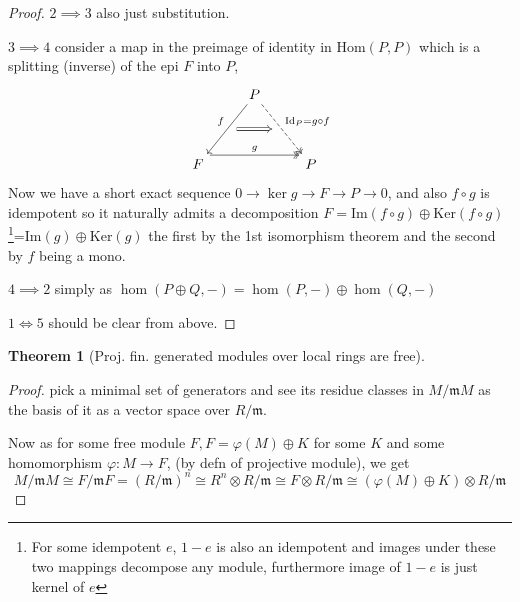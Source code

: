\documentclass[12pt]{article}
\numberwithin{equation}{section}
\newcommand{\Hom}{{\mathrm{Hom}}}
\newcommand{\image}{{\mathrm{Im}}}
\newcommand{\kernel}{{\mathrm{Ker}}}
\newtheorem{theorem}{Theorem}[section]
\begin{document}
\begin{appendices}
\begin{proof}
		$2 \implies 3$ also just substitution.
		
		$3 \implies 4$ consider a map in the preimage of identity in $\Hom(P,P)$ which is a splitting (inverse) of the epi $F$ into $P$,
		\[\begin{tikzcd}
			& P \\
			\\
			F && P
			\arrow["g", shift left=3, two heads, from=3-1, to=3-3]
			\arrow[""{name=0, anchor=center, inner sep=0}, "f"', from=1-2, to=3-1]
			\arrow[""{name=1, anchor=center, inner sep=0}, "{\mathrm{Id}_P=g \circ f}", dashed, two heads, from=1-2, to=3-3]
			\arrow[shorten <=6pt, shorten >=6pt, Rightarrow, from=0, to=1]
		\end{tikzcd}\]
		Now we have a short exact sequence $0 \to \ker g \to F \to P \to 0$, and also $f\circ g $ is idempotent so it naturally admits a decomposition $F = \image(f \circ g) \oplus \kernel (f \circ g)$\footnote{For some idempotent $e$, $1-e$ is also an idempotent and images under these two mappings decompose any module, furthermore image of $1-e$ is just kernel of $e$}=$\image (g) \oplus \kernel (g)$ the first by the 1st isomorphism theorem and the second by $f $ being a mono.
		
		$4 \implies 2$ simply as $\hom (P \oplus Q,-) = \hom(P,-) \oplus \hom(Q,-)$
		
		$1 \iff 5$ should be clear from above.
		
	\end{proof}
	
	\begin{theorem}[Proj. fin. generated modules over local rings are free]\label{a2}
	\end{theorem}
	\begin{proof}
		pick a minimal set of generators and see its residue classes in $M/\mathfrak{m}M$ as the basis of it as a vector space over $R/\mathfrak{m}$.
		
		Now as for some free module $F, F=\varphi(M)\oplus K$ for some $K$ and some homomorphism $\varphi: M \to F$, (by defn of projective module), 	we get \[ M/\mathfrak{m}M \cong 	F/\mathfrak{m}F = (R/\mathfrak{m})^n\cong R^n\otimes R/\mathfrak{m} \cong F \otimes R/\mathfrak{m} \cong (\varphi(M)\oplus K) \otimes R/\mathfrak{m}\]
		

\end{proof}
\end{appendices}
\end{document}
